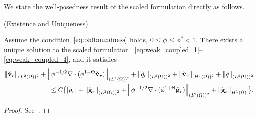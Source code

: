 We state the well-posedness result of the scaled formulation directly as follows.
\begin{lem}\label{lem:ExistenceUniqueness}
		  (Existence and Uniqueness)

		  Assume the condition~$\eqref{eq:phiboundness}$ holds,
		  $0 \leq \phi \leq \phi^* <1$.
		  There exists a unique 
		  solution to the scaled formulation 
		  ~\eqref{eq:weak_coupled_1}--\eqref{eq:weak_coupled_4}, and it satisfies 
		  \begin{equation}
					 \begin{aligned}
					 \left\lVert\check{\mathbf{v}}_r\right\rVert_{(L^2(\Omega))^2} + 
					 \left\lVert\phi^{-1/2}\nabla \cdot (\phi^{1+\Theta}\check{\mathbf{v}}_r)\right\rVert_{(L^2(\Omega))^2} + 
					 \left\lVert\check{q}_l\right\rVert_{(L^2(\Omega))^2} + 
					 \left\lVert\check{\mathbf{v}}_s\right\rVert_{(H^1(\Omega))^2} + \left\lVert\check{q}\right\rVert_{(L^2(\Omega))^2} \\
					\leq	C\big\{\lvert\rho_r \rvert +
								\left\lVert\tilde{\mathbf{g}}_r\right\rVert_{(L^2(\Omega))^2} + 
								\left\lVert\phi^{-1/2}\nabla \cdot (\phi^{1+\Theta}\tilde{\mathbf{g}}_r)\right\rVert_{(L^2(\Omega))^2}		+ \left\lVert\tilde{\mathbf{g}}_s\right\rVert_{H^1(\Omega)}\big\}.
					 \end{aligned}
		  \end{equation}
\end{lem}
\begin{proof}
		  See~\cite{DegenerateDarcy}.
\end{proof}

